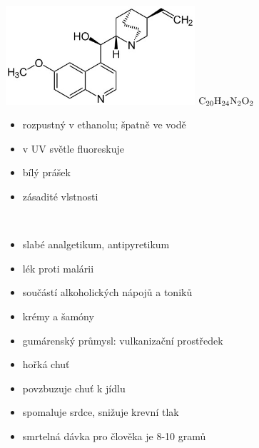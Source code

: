 \documentclass[12pt,a4paper]{article}
\begin{document}
\begin{minipage}{0.5\textwidth}
	\begin{center}
		\includegraphics[width=7cm]{3.jpg}
	$\rm C_{20}H_{24}N_2O_2$
	\end{center}
\end{minipage}
\begin{minipage}{0.5\textwidth}

	\begin{itemize}
		\item rozpustný v ethanolu; špatně ve vodě
		\item v UV světle fluoreskuje
		\item bílý prášek
		\item zásadité vlstnosti
	\end{itemize}
\end{minipage}\\[20px]

\begin{minipage}{0.5\textwidth}
	\begin{itemize}
		\item slabé analgetikum, antipyretikum
		\item lék proti malárii
		\item součástí alkoholických nápojů a toniků
		\item krémy a šamóny
		\item gumárenský průmysl: vulkanizační prostředek
	\end{itemize}
\end{minipage}
\begin{minipage}{0.5\textwidth}
	\begin{itemize}
		\item hořká chuť
		\item povzbuzuje chuť k jídlu
		\item spomaluje srdce, snižuje krevní tlak
		\item smrtelná dávka pro člověka je 8-10 gramů
	\end{itemize}
\end{minipage}
\end{document}
